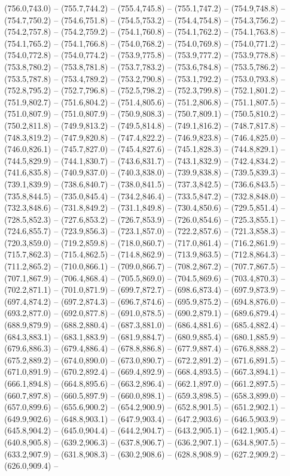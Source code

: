 (756.0,743.0) -- (755.7,744.2) -- (755.4,745.8) -- (755.1,747.2) -- (754.9,748.8) -- (754.7,750.2) -- (754.6,751.8) -- (754.5,753.2) -- (754.4,754.8) -- (754.3,756.2) -- (754.2,757.8) -- (754.2,759.2) -- (754.1,760.8) -- (754.1,762.2) -- (754.1,763.8) -- (754.1,765.2) -- (754.1,766.8) -- (754.0,768.2) -- (754.0,769.8) -- (754.0,771.2) -- (754.0,772.8) -- (754.0,774.2) -- (753.9,775.8) -- (753.9,777.2) -- (753.9,778.8) -- (753.8,780.2) -- (753.8,781.8) -- (753.7,783.2) -- (753.6,784.8) -- (753.5,786.2) -- (753.5,787.8) -- (753.4,789.2) -- (753.2,790.8) -- (753.1,792.2) -- (753.0,793.8) -- (752.8,795.2) -- (752.7,796.8) -- (752.5,798.2) -- (752.3,799.8) -- (752.1,801.2) -- (751.9,802.7) -- (751.6,804.2) -- (751.4,805.6) -- (751.2,806.8) -- (751.1,807.5) -- (751.0,807.9) -- (751.0,807.9) -- (750.9,808.3) -- (750.7,809.1) -- (750.5,810.2) -- (750.2,811.8) -- (749.9,813.2) -- (749.5,814.8) -- (749.1,816.2) -- (748.7,817.8) -- (748.3,819.2) -- (747.9,820.8) -- (747.4,822.2) -- (746.9,823.8) -- (746.4,825.0) -- (746.0,826.1) -- (745.7,827.0) -- (745.4,827.6) -- (745.1,828.3) -- (744.8,829.1) -- (744.5,829.9) -- (744.1,830.7) -- (743.6,831.7) -- (743.1,832.9) -- (742.4,834.2) -- (741.6,835.8) -- (740.9,837.0) -- (740.3,838.0) -- (739.9,838.8) -- (739.5,839.3) -- (739.1,839.9) -- (738.6,840.7) -- (738.0,841.5) -- (737.3,842.5) -- (736.6,843.5) -- (735.8,844.5) -- (735.0,845.4) -- (734.2,846.4) -- (733.5,847.2) -- (732.8,848.0) -- (732.3,848.6) -- (731.8,849.2) -- (731.1,849.8) -- (730.4,850.6) -- (729.5,851.4) -- (728.5,852.3) -- (727.6,853.2) -- (726.7,853.9) -- (726.0,854.6) -- (725.3,855.1) -- (724.6,855.7) -- (723.9,856.3) -- (723.1,857.0) -- (722.2,857.6) -- (721.3,858.3) -- (720.3,859.0) -- (719.2,859.8) -- (718.0,860.7) -- (717.0,861.4) -- (716.2,861.9) -- (715.7,862.3) -- (715.4,862.5) -- (714.8,862.9) -- (713.9,863.5) -- (712.8,864.3) -- (711.2,865.2) -- (710.0,866.1) -- (709.0,866.7) -- (708.2,867.2) -- (707.7,867.5) -- (707.1,867.9) -- (706.4,868.4) -- (705.5,869.0) -- (704.5,869.6) -- (703.4,870.3) -- (702.2,871.1) -- (701.0,871.9) -- (699.7,872.7) -- (698.6,873.4) -- (697.9,873.9) -- (697.4,874.2) -- (697.2,874.3) -- (696.7,874.6) -- (695.9,875.2) -- (694.8,876.0) -- (693.2,877.0) -- (692.0,877.8) -- (691.0,878.5) -- (690.2,879.1) -- (689.6,879.4) -- (688.9,879.9) -- (688.2,880.4) -- (687.3,881.0) -- (686.4,881.6) -- (685.4,882.4) -- (684.3,883.1) -- (683.1,883.9) -- (681.9,884.7) -- (680.9,885.4) -- (680.1,885.9) -- (679.6,886.3) -- (679.4,886.4) -- (678.8,886.8) -- (677.9,887.4) -- (676.8,888.2) -- (675.2,889.2) -- (674.0,890.0) -- (673.0,890.7) -- (672.2,891.2) -- (671.6,891.5) -- (671.0,891.9) -- (670.2,892.4) -- (669.4,892.9) -- (668.4,893.5) -- (667.3,894.1) -- (666.1,894.8) -- (664.8,895.6) -- (663.2,896.4) -- (662.1,897.0) -- (661.2,897.5) -- (660.7,897.8) -- (660.5,897.9) -- (660.0,898.1) -- (659.3,898.5) -- (658.3,899.0) -- (657.0,899.6) -- (655.6,900.2) -- (654.2,900.9) -- (652.8,901.5) -- (651.2,902.1) -- (649.9,902.6) -- (648.8,903.1) -- (647.9,903.4) -- (647.2,903.6) -- (646.5,903.9) -- (645.8,904.2) -- (645.0,904.4) -- (644.2,904.7) -- (643.2,905.1) -- (642.1,905.4) -- (640.8,905.8) -- (639.2,906.3) -- (637.8,906.7) -- (636.2,907.1) -- (634.8,907.5) -- (633.2,907.9) -- (631.8,908.3) -- (630.2,908.6) -- (628.8,908.9) -- (627.2,909.2) -- (626.0,909.4) -- 